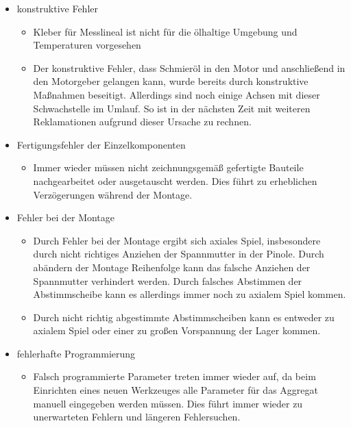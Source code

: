 \begin{itemize}
 \item konstruktive Fehler
 \begin{itemize}
    \item Kleber für Messlineal ist nicht für die ölhaltige Umgebung und Temperaturen vorgesehen
    \item Der konstruktive Fehler, dass Schmieröl in den Motor und anschließend in den Motorgeber gelangen kann, wurde bereits durch konstruktive Maßnahmen beseitigt. Allerdings sind noch einige Achsen mit dieser Schwachstelle im Umlauf. So ist in der nächsten Zeit mit weiteren Reklamationen aufgrund dieser Ursache zu rechnen.
 \end{itemize}
 
 
 
 
 
 \item Fertigungsfehler der Einzelkomponenten
 \begin{itemize}
    \item Immer wieder müssen nicht zeichnungsgemäß gefertigte Bauteile nachgearbeitet oder ausgetauscht werden. Dies führt zu erheblichen Verzögerungen während der Montage.
 \end{itemize}
 
 
 
 \item Fehler bei der Montage 
 \begin{itemize}
    \item Durch Fehler bei der Montage ergibt sich axiales Spiel, insbesondere durch nicht richtiges Anziehen der Spannmutter in der Pinole. Durch abändern der Montage Reihenfolge kann das falsche Anziehen der Spannmutter verhindert werden. Durch falsches Abstimmen der Abstimmscheibe kann es allerdings immer noch zu axialem Spiel kommen.
    \item Durch nicht richtig abgestimmte Abstimmscheiben kann es entweder zu axialem Spiel oder einer zu großen Vorspannung der Lager kommen.
 \end{itemize}
 
 
 
 
 \item fehlerhafte Programmierung
 \begin{itemize}
    \item Falsch programmierte Parameter treten immer wieder auf, da beim Einrichten eines neuen Werkzeuges alle Parameter für das Aggregat manuell eingegeben werden müssen. Dies führt immer wieder zu unerwarteten Fehlern und längeren Fehlersuchen.
 \end{itemize}
 

\end{itemize}
